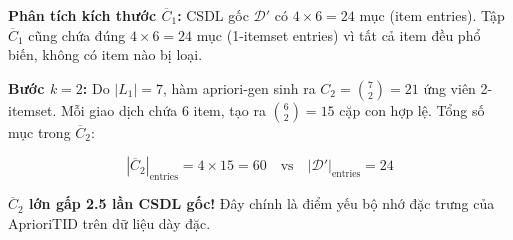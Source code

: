 \textbf{Phân tích kích thước $\overline{C}_1$:} CSDL gốc $\mathcal{D}'$ có $4 \times 6 = 24$ mục (item entries). Tập $\overline{C}_1$ cũng chứa đúng $4 \times 6 = 24$ mục (1-itemset entries) vì tất cả item đều phổ biến, không có item nào bị loại.

\textbf{Bước $k=2$:} Do $|L_1| = 7$, hàm apriori-gen sinh ra $C_2 = \binom{7}{2} = 21$ ứng viên 2-itemset. Mỗi giao dịch chứa 6 item, tạo ra $\binom{6}{2} = 15$ cặp con hợp lệ. Tổng số mục trong $\overline{C}_2$:

$$|\overline{C}_2|_{\text{entries}} = 4 \times 15 = 60 \quad \text{vs} \quad |\mathcal{D}'|_{\text{entries}} = 24$$

\textbf{$\overline{C}_2$ lớn gấp 2.5 lần CSDL gốc!} Đây chính là điểm yếu bộ nhớ đặc trưng của AprioriTID trên dữ liệu dày đặc.

